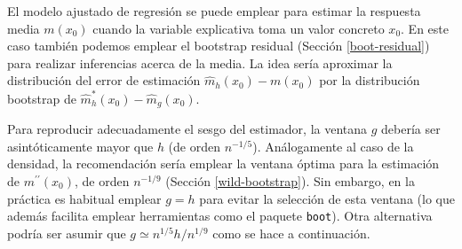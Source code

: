 \documentclass[
]{book}
\theoremstyle{break}
\theoremstyle{nonumberplain}
\begin{document}
El modelo ajustado de regresión se puede emplear para estimar la respuesta media \(m(x_0)\) cuando la variable explicativa toma un valor concreto \(x_0\).
En este caso también podemos emplear el bootstrap residual (Sección \ref{boot-residual}) para realizar inferencias acerca de la media.
La idea sería aproximar la distribución del error de estimación \(\hat{m}_h(x_0) - m(x_0)\) por la distribución bootstrap de \(\hat{m}^{\ast}_h(x_0) - \hat{m}_g(x_0)\).

Para reproducir adecuadamente el sesgo del estimador, la ventana \(g\) debería ser asintóticamente mayor que \(h\) (de orden \(n^{-1/5}\)).
Análogamente al caso de la densidad, la recomendación sería emplear la ventana óptima para la estimación de \(m^{\prime \prime }\left( x_0 \right)\), de orden \(n^{-1/9}\) (Sección \ref{wild-bootstrap}).
Sin embargo, en la práctica es habitual emplear \(g=h\) para evitar la selección de esta ventana (lo que además facilita emplear herramientas como el paquete \texttt{boot}).
Otra alternativa podría ser asumir que \(g \simeq n^{1/5}h/n^{1/9}\) como se hace a continuación.
\end{document}

